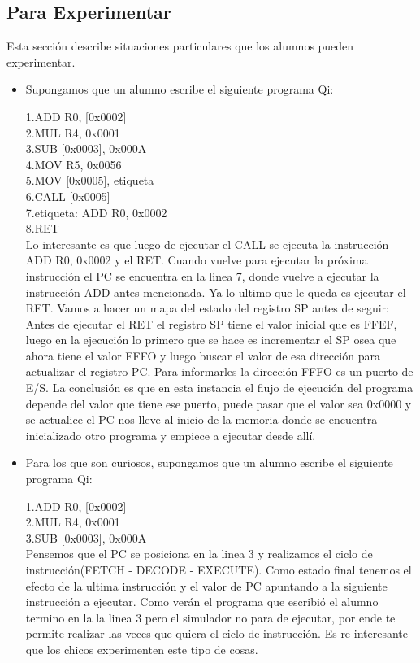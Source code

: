 \subsection{Para Experimentar}

Esta sección describe situaciones particulares que los alumnos pueden experimentar.

\begin{itemize}

\item Supongamos que un alumno escribe el siguiente programa Qi:

1.ADD R0, [0x0002]\\
2.MUL R4, 0x0001 \\
3.SUB [0x0003], 0x000A \\
4.MOV R5, 0x0056 \\
5.MOV [0x0005], etiqueta \\
6.CALL [0x0005] \\
7.etiqueta: ADD R0, 0x0002 \\
8.RET \\

Lo interesante es que luego de ejecutar el CALL se ejecuta la instrucción ADD R0, 0x0002 y el RET. Cuando vuelve para ejecutar la próxima instrucción el PC se encuentra en la linea 7, donde vuelve a ejecutar la instrucción ADD antes mencionada. Ya lo ultimo que le queda es ejecutar el RET.
Vamos a hacer un mapa del estado del registro SP antes de seguir: Antes de ejecutar el RET  el registro SP tiene el valor inicial que es FFEF, luego en la ejecución lo primero que se hace es incrementar el SP osea que ahora tiene el valor FFFO y luego buscar el valor de esa dirección para actualizar el registro PC. Para informarles la dirección FFFO es un puerto de E/S. La conclusión es que en esta instancia el flujo de ejecución del programa depende del valor que tiene ese puerto, puede pasar que el valor sea 0x0000 y se actualice el PC nos lleve al inicio de la memoria donde se encuentra inicializado otro programa y empiece a ejecutar desde allí. 


\item Para los que son curiosos, supongamos que un alumno escribe el siguiente programa Qi:

1.ADD R0, [0x0002]\\
2.MUL R4, 0x0001 \\
3.SUB [0x0003], 0x000A \\

Pensemos que el PC se posiciona en la linea 3 y realizamos el ciclo de instrucción(FETCH - DECODE - EXECUTE). Como estado final tenemos el efecto de la ultima instrucción y el valor de PC apuntando a la siguiente instrucción a ejecutar. Como verán el programa que escribió el alumno termino en la la linea 3 pero el simulador no para de ejecutar, por ende te permite realizar las veces que quiera el ciclo de instrucción. Es re interesante que los chicos experimenten este tipo de cosas.

\end{itemize} 


